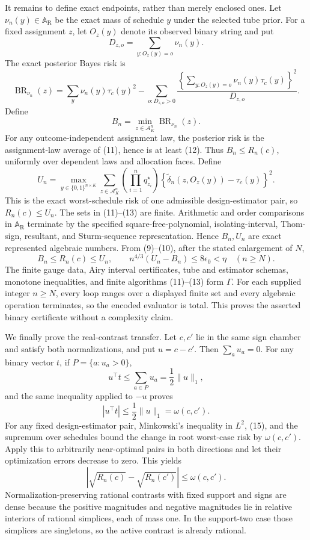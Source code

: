 It remains to define exact endpoints, rather than merely enclosed ones.  Let \(\nu_n(y)\in\mathbb A_{\mathrm R}\) be the exact mass of schedule \(y\) under the selected tube prior.  For a fixed assignment \(z\), let \(O_z(y)\) denote its observed binary string and put
\[
D_{z,o}=\sum_{y:O_z(y)=o}\nu_n(y).
\]
The exact posterior Bayes risk is
\[
\operatorname{BR}_{\nu_n}(z)
=\sum_y\nu_n(y)\tau_c(y)^2
-\sum_{o:D_{z,o}>0}
\frac{\left\{\sum_{y:O_z(y)=o}\nu_n(y)\tau_c(y)\right\}^2}{D_{z,o}}.
\tag{11}
\]
Define
\[
B_n=\min_{z\in\mathcal A_K^n}\operatorname{BR}_{\nu_n}(z).
\tag{12}
\]
For any outcome-independent assignment law, the posterior risk is the assignment-law average of (11), hence is at least (12).  Thus \(B_n\le R_n(c)\), uniformly over dependent laws and allocation faces.  Define
\[
U_n=\max_{y\in\{0,1\}^{n\times K}}
\sum_{z\in\mathcal A_K^n}
\left(\prod_{i=1}^nq_{z_i}^\star\right)
\left\{\widetilde\delta_n(z,O_z(y))-\tau_c(y)\right\}^2.
\tag{13}
\]
This is the exact worst-schedule risk of one admissible design-estimator pair, so \(R_n(c)\le U_n\).  The sets in (11)--(13) are finite.  Arithmetic and order comparisons in \(\mathbb A_{\mathrm R}\) terminate by the specified square-free-polynomial, isolating-interval, Thom-sign, resultant, and Sturm-sequence representation.  Hence \(B_n,U_n\) are exact represented algebraic numbers.  From (9)--(10), after the stated enlargement of \(N\),
\[
B_n\le R_n(c)\le U_n,
\qquad
n^{4/3}(U_n-B_n)\le8\epsilon_0<\eta
\quad(n\ge N).
\tag{14}
\]
The finite gauge data, Airy interval certificates, tube and estimator schemas, monotone inequalities, and finite algorithms (11)--(13) form \(\Gamma\).  For each supplied integer \(n\ge N\), every loop ranges over a displayed finite set and every algebraic operation terminates, so the encoded evaluator is total.  This proves the asserted binary certificate without a complexity claim.

We finally prove the real-contrast transfer.  Let \(c,c'\) lie in the same sign chamber and satisfy both normalizations, and put \(u=c-c'\).  Then \(\sum_a u_a=0\).  For any binary vector \(t\), if \(P=\{a:u_a>0\}\),
\[
u^\top t\le\sum_{a\in P}u_a=\frac12\lVert u\rVert_1,
\]
and the same inequality applied to \(-u\) proves
\[
|u^\top t|\le\frac12\lVert u\rVert_1=\omega(c,c').
\tag{15}
\]
For any fixed design-estimator pair, Minkowski's inequality in \(L^2\), (15), and the supremum over schedules bound the change in root worst-case risk by \(\omega(c,c')\).  Apply this to arbitrarily near-optimal pairs in both directions and let their optimization errors decrease to zero.  This yields
\[
\left|\sqrt{R_n(c)}-\sqrt{R_n(c')}\right|
\le\omega(c,c').
\tag{16}
\]
Normalization-preserving rational contrasts with fixed support and signs are dense because the positive magnitudes and negative magnitudes lie in relative interiors of rational simplices, each of mass one.  In the support-two case those simplices are singletons, so the active contrast is already rational.

